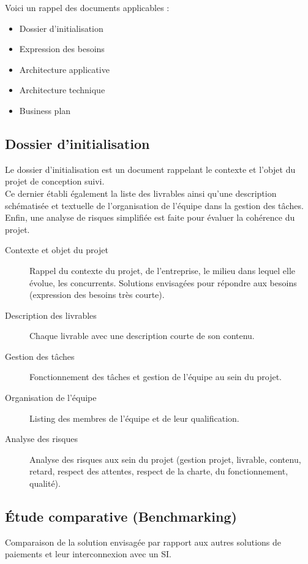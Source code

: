 Voici un rappel des documents applicables :
\begin{itemize}
  \item Dossier d'initialisation
  \item Expression des besoins
  \item Architecture applicative
  \item Architecture technique
  \item Business plan
\end{itemize}

\subsection{Dossier d'initialisation}
Le dossier d'initialisation est un document rappelant le contexte et l'objet du
projet de conception suivi. \\

Ce dernier établi également la liste des livrables ainsi qu'une description
schématisée et textuelle de l'organisation de l'équipe dans la gestion des
tâches. \\
Enfin, une analyse de risques simplifiée est faite pour évaluer la cohérence du
projet. \\

\begin{description}
  \item[Contexte et objet du projet] Rappel du contexte du projet, de
    l'entreprise, le milieu dans lequel elle évolue, les concurrents.
    Solutions envisagées pour répondre aux besoins (expression des besoins
    très courte).
  \item[Description des livrables] Chaque livrable avec une description courte
    de son contenu.
  \item[Gestion des tâches] Fonctionnement des tâches et gestion de l'équipe au
    sein du projet.
  \item[Organisation de l'équipe] Listing des membres de l'équipe et de leur
    qualification.
  \item[Analyse des risques] Analyse des risques aux sein du projet (gestion
    projet, livrable, contenu, retard, respect des attentes, respect de
    la charte, du fonctionnement, qualité).
\end{description}

\subsection{Étude comparative (Benchmarking)}
Comparaison de la solution envisagée par rapport aux autres solutions de
paiements et leur interconnexion avec un SI.

